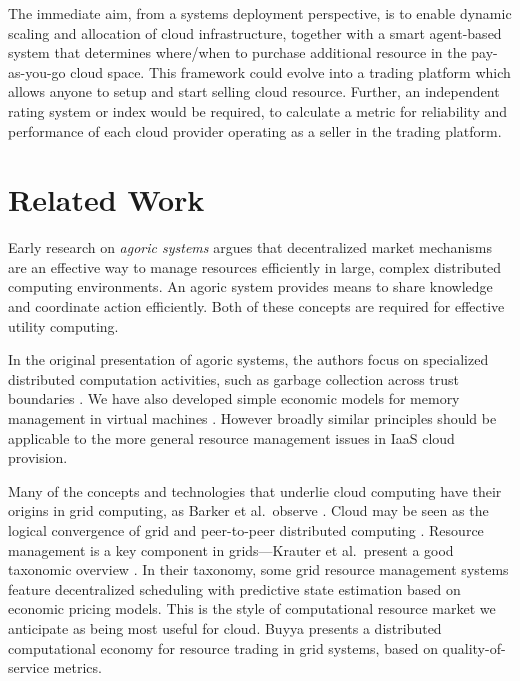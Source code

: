\documentclass[conference,10pt]{IEEEtran}
\begin{document}
The immediate aim, from a systems deployment perspective, is to enable
dynamic scaling and allocation of cloud infrastructure, together with a smart agent-based system that determines where/when to purchase  additional resource 
in the pay-as-you-go cloud space. 
This framework could evolve into 
a trading platform which allows anyone to setup and start selling cloud resource. Further, an independent rating system or index would be required, to calculate a metric for reliability and performance of each cloud provider operating as a seller in the trading platform.


\section{Related Work}
\label{sec-relw}

Early research on \emph{agoric systems}  \cite{miller88markets} argues that decentralized market mechanisms are an effective way to manage resources efficiently in large, complex distributed computing environments. An agoric system provides means to share knowledge and coordinate action efficiently. Both of these concepts are required for effective utility computing.

In the original presentation of agoric systems, the authors focus on specialized distributed computation activities, such as garbage collection across trust boundaries \cite{miller88incentive}. We have also developed simple economic models for memory management in virtual machines \cite{singer10economics,cameron15judgment}.  However broadly similar principles should be applicable to the more general resource management issues in IaaS cloud provision.


Many of the concepts and technologies that underlie cloud computing have their origins in grid computing, as Barker et al.\ observe \cite{barker14academic}.
Cloud may be seen as the logical convergence of grid and peer-to-peer distributed computing \cite{foster03death}.
Resource management is a key component in grids---Krauter et al.\ present a good taxonomic overview \cite{krauter02taxonomy}. In their taxonomy, some grid resource management systems feature decentralized scheduling with predictive state estimation based on economic pricing models. This is the style of computational resource market we anticipate as being most useful for cloud.
Buyya \cite{buyya02economic} presents a distributed computational economy for resource trading in grid systems, based on quality-of-service metrics.
\end{document}
